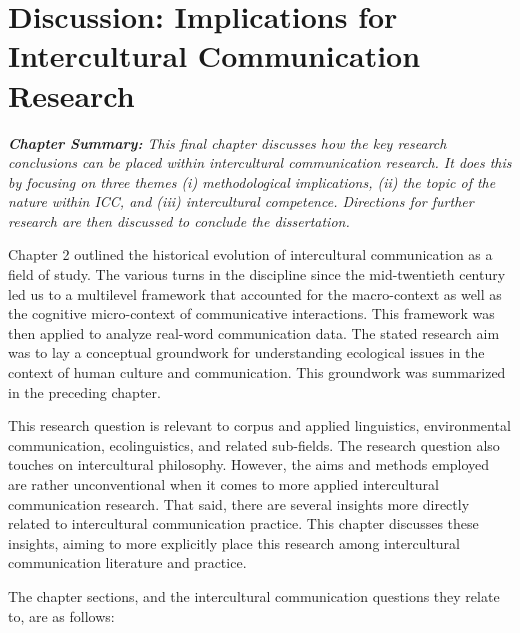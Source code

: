 \chapter{Discussion: Implications for Intercultural Communication Research}

\textit{\textbf{Chapter Summary:} This final chapter discusses how the key research conclusions can be placed within intercultural communication research. It does this by focusing on three themes (i) methodological implications, (ii) the topic of the nature within ICC, and (iii) intercultural competence. Directions for further research are then discussed to conclude the dissertation.}
\newline

Chapter 2 outlined the historical evolution of intercultural communication as a field of study. The various turns in the discipline since the mid-twentieth century led us to a multilevel framework that accounted for the macro-context as well as the cognitive micro-context of communicative interactions. This framework was then applied to analyze real-word communication data. The stated research aim was to lay a conceptual groundwork for understanding ecological issues in the context of human culture and communication. This groundwork was summarized in the preceding chapter. 

This research question is relevant to corpus and applied linguistics, environmental communication, ecolinguistics, and related sub-fields. The research question also touches on intercultural philosophy. However, the aims and methods employed are rather unconventional when it comes to more applied intercultural communication research. That said, there are several insights more directly related to intercultural communication practice. This chapter discusses these insights, aiming to more explicitly place this research among intercultural communication literature and practice.

The chapter sections, and the intercultural communication questions they relate to, are as follows: 


